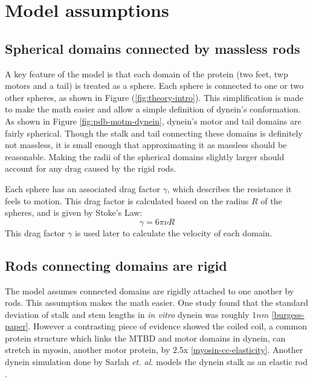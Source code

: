 \documentclass[
11pt, %
english, %
singlespacing, %
headsepline, %
chapterinoneline, %
]{MastersDoctoralThesis} %
\begin{document}

\section{Model assumptions}
\subsection{Spherical domains connected by massless rods}
A key feature of the model is that each domain of the protein (two feet, twp motors and a tail) is treated as a sphere. Each sphere is connected to one or two other spheres, as shown in Figure (\ref{fig:theory-intro}). This simplification is made to make the math easier and allow a simple definition of dynein's conformation.\\

As shown in Figure \ref{fig:pdb-motm-dynein}, dynein's motor and tail domains are fairly spherical. Though the stalk and tail connecting these domains is definitely not massless, it is small enough that approximating it as massless should be reasonable. Making the radii of the spherical domains slightly larger should account for any drag caused by the rigid rods.

Each sphere has an associated drag factor $\gamma$, which describes the resistance it feels to motion. This drag factor is calculated based on the radius $R$ of the spheres, and is given by Stoke's Law:
%
\begin{equation}
  \gamma = 6\pi\nu R
\end{equation}
%
This drag factor $\gamma$ is used later to calculate the velocity of each domain.\\

\subsection{Rods connecting domains are rigid}
The model assumes connected domains are rigidly attached to one another by rods. This assumption makes the math easier. One study found that the standard deviation of stalk and stem lengths in \textit{in vitro} dynein was roughly $1nm$ \ref{burgess-paper}. However a contrasting piece of evidence showed the coiled coil, a common protein structure which links the MTBD and motor domains in dynein, can stretch in myosin, another motor protein, by 2.5x \ref{myosin-cc-elasticity}. Another dynein simulation done by Sarlah \textit{et. al.} models the dynein stalk as an elastic rod \cite{sarlahmodel}.\\
\end{document}
